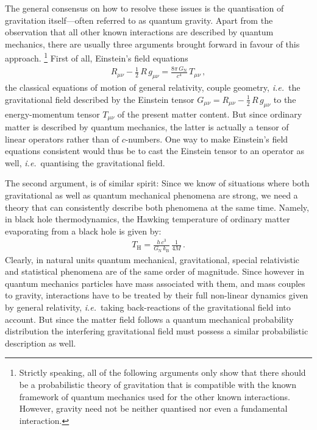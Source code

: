 \documentclass[11pt]{book}
\newcommand\GNewton{ G_{\scriptscriptstyle{\mathrm{N}}}{} }
\newcommand\kBoltzmann{ k_{\scriptscriptstyle{\mathrm{B}}} }
\newcommand\THawking{ T_{\scriptscriptstyle{\mathrm{H}}} }
\newcommand\ie{\textit{i.e.}\ }
\numberwithin{equation}{chapter}
\begin{document}
The general consensus on how to resolve these issues is the quantisation of gravitation
itself---often referred to as quantum gravity.
Apart from the observation that all other known interactions are described by
quantum mechanics, there are usually three arguments brought forward in favour of this
approach.%
\footnote{
  Strictly speaking, all of the following arguments only show that there should be
  a probabilistic theory of gravitation that is compatible with the known
  framework of quantum mechanics used for the other known interactions.
  However, gravity need not be neither quantised nor even a fundamental interaction.
}%
First of all, Einstein's field equations
\begin{align*}
  R_{\mu \nu} - \tfrac{1}{2} \, R \, g_{\mu \nu} = \frac{8 \pi \, \GNewton }{c^4} \, T_{\mu \nu} \,,
\end{align*}
the classical equations of motion of general relativity, couple geometry, \ie the gravitational
field described by the Einstein tensor $G_{\mu\nu} = R_{\mu\nu} - \tfrac{1}{2} \, R \,g_{\mu\nu}$ to
the energy-momentum tensor $T_{\mu\nu}$ of the present matter content. But since ordinary matter
is described by quantum mechanics, the latter is actually a tensor of linear operators rather than
of $c$-numbers. One way to make Einstein's field equations consistent would thus be to
cast the Einstein tensor to an operator as well, \ie quantising the gravitational field.

The second argument, is of similar spirit: Since we know of situations where both gravitational
as well as quantum mechanical phenomena are strong, we need a theory that can consistently
describe both phenomena at the same time. Namely, in black hole thermodynamics,
the Hawking temperature of ordinary matter evaporating from a black hole is given by:
\begin{align*}
  \THawking = \frac{h \, c^3}{\GNewton \, \kBoltzmann} \, \frac {1}{4M} \,.
\end{align*}
Clearly, in natural units quantum mechanical, gravitational, special relativistic and
statistical phenomena are of the same order of magnitude. Since however in quantum mechanics
particles have mass associated with them, and mass couples to gravity, interactions have to
be treated by their full non-linear dynamics given by general relativity,
\ie taking back-reactions of the gravitational
field into account. But since the matter field follows a quantum mechanical probability distribution
the interfering gravitational field must possess a similar probabilistic description as well.
\end{document}
